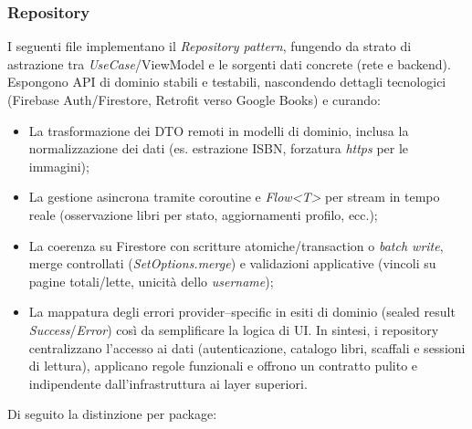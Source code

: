 \documentclass{article}
\begin{document}
\subsubsection{Repository}
I seguenti file implementano il \textit{Repository pattern}, fungendo da strato di astrazione tra \textit{UseCase}/ViewModel e le sorgenti dati concrete (rete e backend). Espongono API di dominio stabili e testabili, nascondendo dettagli tecnologici (Firebase Auth/Firestore, Retrofit verso Google Books) e curando: 
\begin{itemize}
  \item La trasformazione dei DTO remoti in modelli di dominio, inclusa la normalizzazione dei dati (es. estrazione ISBN, forzatura \textit{https} per le immagini); 
  \item La gestione asincrona tramite coroutine e \textit{Flow\textless{}T\textgreater{}} per stream in tempo reale (osservazione libri per stato, aggiornamenti profilo, ecc.); 
  \item La coerenza su Firestore con scritture atomiche/transaction o \textit{batch write}, merge controllati (\textit{SetOptions.merge}) e validazioni applicative (vincoli su pagine totali/lette, unicità dello \textit{username}); 
  \item La mappatura degli errori provider–specific in esiti di dominio (sealed result \textit{Success}/\textit{Error}) così da semplificare la logica di UI. In sintesi, i repository centralizzano l’accesso ai dati (autenticazione, catalogo libri, scaffali e sessioni di lettura), applicano regole funzionali e offrono un contratto pulito e indipendente dall’infrastruttura ai layer superiori.
\end{itemize}
Di seguito la distinzione per package:
\end{document}
